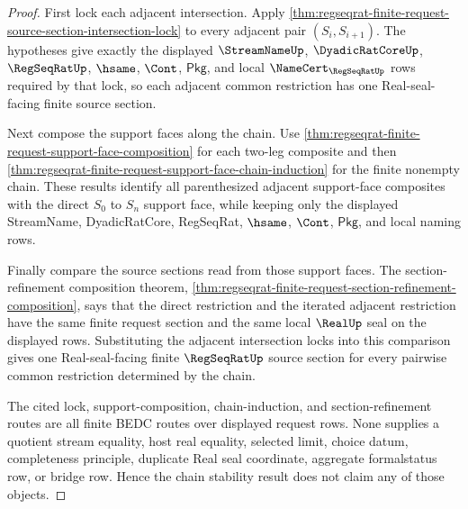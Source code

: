 \begin{proof}
First lock each adjacent intersection. Apply
\autoref{thm:regseqrat-finite-request-source-section-intersection-lock} to
every adjacent pair $(S_i,S_{i+1})$. The hypotheses give exactly the displayed
$\StreamNameUp$, $\DyadicRatCoreUp$, $\RegSeqRatUp$, $\hsame$, $\Cont$,
$\mathsf{Pkg}$, and local $\NameCert_{\RegSeqRatUp}$ rows required by that
lock, so each adjacent common restriction has one Real-seal-facing finite
source section.

Next compose the support faces along the chain. Use
\autoref{thm:regseqrat-finite-request-support-face-composition} for each
two-leg composite and then
\autoref{thm:regseqrat-finite-request-support-face-chain-induction} for the
finite nonempty chain. These results identify all parenthesized adjacent
support-face composites with the direct $S_0$ to $S_n$ support face, while
keeping only the displayed StreamName, DyadicRatCore, RegSeqRat, $\hsame$,
$\Cont$, $\mathsf{Pkg}$, and local naming rows.

Finally compare the source sections read from those support faces. The
section-refinement composition theorem,
\autoref{thm:regseqrat-finite-request-section-refinement-composition}, says
that the direct restriction and the iterated adjacent restriction have the
same finite request section and the same local $\RealUp$ seal on the displayed
rows. Substituting the adjacent intersection locks into this comparison gives
one Real-seal-facing finite $\RegSeqRatUp$ source section for every pairwise
common restriction determined by the chain.

The cited lock, support-composition, chain-induction, and
section-refinement routes are all finite BEDC routes over displayed request
rows. None supplies a quotient stream equality, host real equality, selected
limit, choice datum, completeness principle, duplicate Real seal coordinate,
aggregate formalstatus row, or bridge row. Hence the chain stability result
does not claim any of those objects.
\end{proof}

